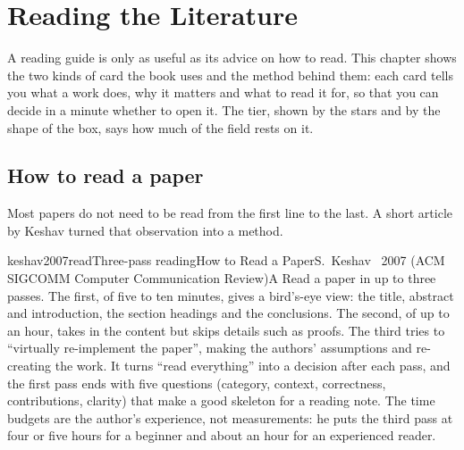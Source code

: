 %
\chapter{Reading the Literature}
\label{ch:reading}

A reading guide is only as useful as its advice on how to read. This chapter shows the two kinds of card the book
uses and the method behind them: each card tells you what a work does, why it matters and what to read it for, so
that you can decide in a minute whether to open it. The tier, shown by the stars and by the shape of the box, says
how much of the field rests on it.

\section{How to read a paper}
\label{sec:reading-how}

Most papers do not need to be read from the first line to the last. A short article by Keshav turned that
observation into a method.

\begin{webcard}{keshav2007read}{Three-pass reading}{How to Read a Paper}{S.~Keshav \textperiodcentered\ 2007 (ACM SIGCOMM Computer Communication Review)}{A}
 Read a paper in up to three passes. The first, of five to ten minutes, gives a bird's-eye view: the title,
abstract and introduction, the section headings and the conclusions. The second, of up to an hour, takes in the
content but skips details such as proofs. The third tries to ``virtually re-implement the paper'', making the
authors' assumptions and re-creating the work.
 It turns ``read everything'' into a decision after each pass, and the first pass ends with five
questions (category, context, correctness, contributions, clarity) that make a good skeleton for a reading note.
 The time budgets are the author's experience, not measurements: he puts the third pass at four or five
hours for a beginner and about an hour for an experienced reader.
\end{webcard}

